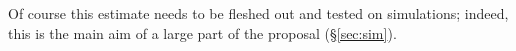 %
Of course this estimate needs to be fleshed out and tested on simulations; 
indeed, this is the main aim of a large part of the proposal (\S\ref{sec:sim}).






